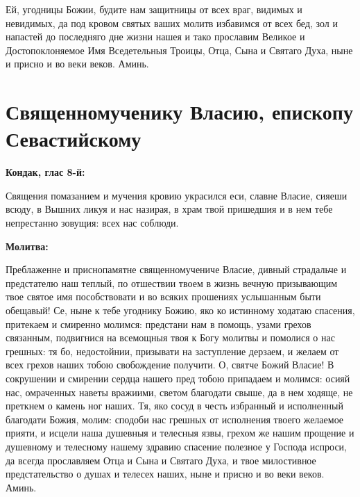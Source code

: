 Ей, угодницы Божии, будите нам защитницы от всех враг, видимых и невидимых, да под кровом святых ваших молитв избавимся от всех бед, зол и напастей до последняго дне жизни нашея и тако прославим Великое и Достопоклоняемое Имя Вседетельныя Троицы, Отца, Сына и Святаго Духа, ныне и присно и во веки веков. Аминь.
\longpage{}\mychapterending


 

\vspace{-2\baselineskip}\section{Священномученику Власию, епископу Севастийскому}
 

\bfseries Кондак, глас 8-й:\normalfont{}\nopagebreak


Священия помазанием и мучения кровию украсился еси, славне Власие, сияеши всюду, в Вышних ликуя и нас назирая, в храм твой пришедшия и в нем тебе непрестанно зовущия: всех нас соблюди.


\medskip


\bfseries Молитва:\normalfont{}\nopagebreak


Преблаженне и приснопамятне священномучениче Власие, дивный страдальче и предстателю наш теплый, по отшествии твоем в жизнь вечную призывающим твое святое имя пособствовати и во всяких прошениях услышанным быти обещавый! Се, ныне к тебе угоднику Божию, яко ко истинному ходатаю спасения, притекаем и смиренно молимся: предстани нам в помощь, узами грехов связанным, подвигнися на всемощныя твоя к Богу молитвы и помолися о нас грешных: тя бо, недостойнии, призывати на заступление дерзаем, и желаем от всех грехов наших тобою свобождение получити. О, святче Божий Власие! В сокрушении и смирении сердца нашего пред тобою припадаем и молимся: осияй нас, омраченных наветы вражиими, светом благодати свыше, да в нем ходяще, не преткнем о камень ног наших. Тя, яко сосуд в честь избранный и исполненный благодати Божия, молим: сподоби нас грешных от исполнения твоего желаемое прияти, и исцели наша душевныя и телесныя язвы, грехом же нашим прощение и душевному и телесному нашему здравию спасение полезное у Господа испроси, да всегда прославляем Отца и Сына и Святаго Духа, и твое милостивное предстательство о душах и телесех наших, ныне и присно и во веки веков. Аминь.
\longpage{}\mychapterending
